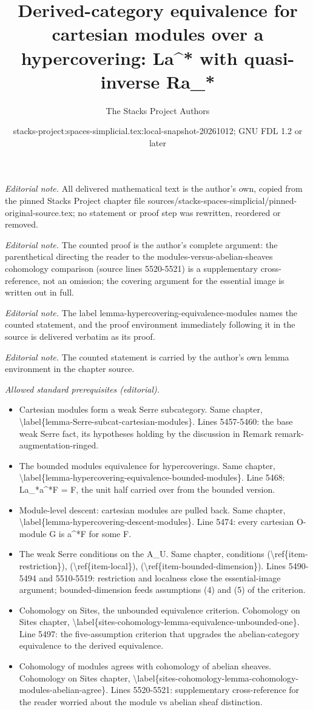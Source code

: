 \documentclass{stacks-project}
\title{Derived-category equivalence for cartesian modules over a hypercovering: La\textasciicircum{}* with quasi-inverse Ra\_*}
\author{The Stacks Project Authors}
\date{stacks-project:spaces-simplicial.tex:local-snapshot-20261012; GNU FDL 1.2 or later}
\theoremstyle{plain}
\theoremstyle{definition}
\theoremstyle{remark}
\numberwithin{equation}{subsection}
\begin{document}
\maketitle
\noindent\textit{Editorial note.} All delivered mathematical text is the author's own, copied from the pinned Stacks Project chapter file sources/stacks-spaces-simplicial/pinned-original-source.tex; no statement or proof step was rewritten, reordered or removed.\par\medskip
\noindent\textit{Editorial note.} The counted proof is the author's complete argument: the parenthetical directing the reader to the modules-versus-abelian-sheaves cohomology comparison (source lines 5520-5521) is a supplementary cross-reference, not an omission; the covering argument for the essential image is written out in full.\par\medskip
\noindent\textit{Editorial note.} The label lemma-hypercovering-equivalence-modules names the counted statement, and the proof environment immediately following it in the source is delivered verbatim as its proof.\par\medskip
\noindent\textit{Editorial note.} The counted statement is carried by the author's own lemma environment in the chapter source.\par\medskip
\noindent\textit{Allowed standard prerequisites (editorial).}\begin{itemize}
\item Cartesian modules form a weak Serre subcategory. Same chapter, \textbackslash{}label\{lemma-Serre-subcat-cartesian-modules\}. Lines 5457-5460: the base weak Serre fact, its hypotheses holding by the discussion in Remark remark-augmentation-ringed.
\item The bounded modules equivalence for hypercoverings. Same chapter, \textbackslash{}label\{lemma-hypercovering-equivalence-bounded-modules\}. Line 5468: La\_*a\textasciicircum{}*F = F, the unit half carried over from the bounded version.
\item Module-level descent: cartesian modules are pulled back. Same chapter, \textbackslash{}label\{lemma-hypercovering-descent-modules\}. Line 5474: every cartesian O-module G is a\textasciicircum{}*F for some F.
\item The weak Serre conditions on the A\_U. Same chapter, conditions (\textbackslash{}ref\{item-restriction\}), (\textbackslash{}ref\{item-local\}), (\textbackslash{}ref\{item-bounded-dimension\}). Lines 5490-5494 and 5510-5519: restriction and localness close the essential-image argument; bounded-dimension feeds assumptions (4) and (5) of the criterion.
\item Cohomology on Sites, the unbounded equivalence criterion. Cohomology on Sites chapter, \textbackslash{}label\{sites-cohomology-lemma-equivalence-unbounded-one\}. Line 5497: the five-assumption criterion that upgrades the abelian-category equivalence to the derived equivalence.
\item Cohomology of modules agrees with cohomology of abelian sheaves. Cohomology on Sites chapter, \textbackslash{}label\{sites-cohomology-lemma-cohomology-modules-abelian-agree\}. Lines 5520-5521: supplementary cross-reference for the reader worried about the module vs abelian sheaf distinction.
\end{itemize}\medskip
\end{document}
